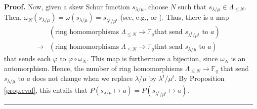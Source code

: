 \documentclass[numbers=enddot,12pt,final,onecolumn,notitlepage]{scrartcl}%
\theoremstyle{definition}
\newenvironment{proof}[1][Proof]{\noindent\textbf{#1.} }{\ \rule{0.5em}{0.5em}}
\newenvironment{vershort}{}{}
\theoremstyle{plainsl}
\begin{document}
\begin{vershort}
\begin{proof}
Now, given a skew Schur function  $s_{\lambda/\mu}$, choose  $N$ such that
$s_{\lambda/\mu} \in \Lambda_{\le N}$.  Then,
$\omega_N\left(  s_{\lambda/\mu}\right) = \omega\left(  s_{\lambda/\mu}\right)
=s_{\lambda^{t} /\mu^{t}}$ (see, e.g., \cite[Theorem 7.15.6]{EC2} or \cite[(5.6)]{Macdonald}).
Thus, there is a map
\begin{align*}
& \left(  \text{ring homomorphisms  $\Lambda_{\le N} \to \mathbb{F}_q$
that send  $s_{\lambda^{t} /\mu^{t}}$ to  $a$} \right)  \\
\to & \left(  \text{ring homomorphisms  $\Lambda_{\le N} \to \mathbb{F}_q$
that send  $s_{\lambda /\mu}$ to  $a$} \right)
\end{align*}
that sends each
$\varphi$ to $\varphi \circ \omega_N$.
This map is furthermore a bijection, since $\omega_N$ is an automorphism.
Hence, the number of ring homomorphisms  $\Lambda_{\le N} \to \mathbb{F}_q$
that send  $s_{\lambda /\mu}$ to  $a$ does not change when we replace
$\lambda / \mu$ by $\lambda^t / \mu^t$.
By Proposition \ref{prop.eval}, this entails that
$P\left(  s_{\lambda/\mu}\mapsto a\right)  =P\left(  s_{\lambda^{t}/\mu^{t}%
}\mapsto a\right) $.
\end{proof}
\end{vershort}
\end{document}
